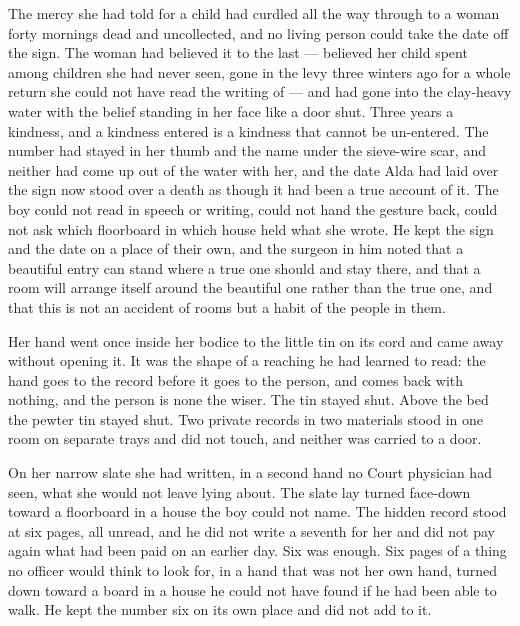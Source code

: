 The mercy she had told for a child had curdled all the way through to a woman forty mornings dead and uncollected, and no living person could take the date off the sign. The woman had believed it to the last --- believed her child spent among children she had never seen, gone in the levy three winters ago for a whole return she could not have read the writing of --- and had gone into the clay-heavy water with the belief standing in her face like a door shut. Three years a kindness, and a kindness entered is a kindness that cannot be un-entered. The number had stayed in her thumb and the name under the sieve-wire scar, and neither had come up out of the water with her, and the date Alda had laid over the sign now stood over a death as though it had been a true account of it. The boy could not read  in speech or writing, could not hand the gesture back, could not ask which floorboard in which house held what she wrote. He kept the sign and the date on a place of their own, and the surgeon in him noted that a beautiful entry can stand where a true one should and stay there, and that a room will arrange itself around the beautiful one rather than the true one, and that this is not an accident of rooms but a habit of the people in them.

Her hand went once inside her bodice to the little tin on its cord and came away without opening it. It was the shape of a reaching he had learned to read: the hand goes to the record before it goes to the person, and comes back with nothing, and the person is none the wiser. The tin stayed shut. Above the bed the pewter tin stayed shut. Two private records in two materials stood in one room on separate trays and did not touch, and neither was carried to a door.

On her narrow slate she had written, in a second hand no Court physician had seen, what she would not leave lying about. The slate lay turned face-down toward a floorboard in a house the boy could not name. The hidden record stood at six pages, all unread, and he did not write a seventh for her and did not pay again what had been paid on an earlier day. Six was enough. Six pages of a thing no officer would think to look for, in a hand that was not her own hand, turned down toward a board in a house he could not have found if he had been able to walk. He kept the number six on its own place and did not add to it.

